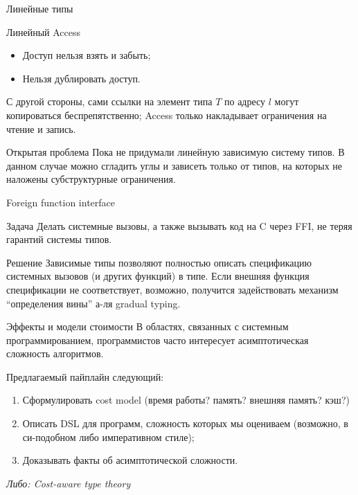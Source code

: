 \documentclass{beamer}
\begin{document}
\begin{frame}{Линейные типы}
  \begin{block}{Линейный Access}
    \begin{itemize}
      \item Доступ нельзя взять и забыть;
      \item Нельзя дублировать доступ.
    \end{itemize}
    С другой стороны, сами ссылки на элемент типа $T$ по адресу $l$ могут
    копироваться беспрепятственно; Access только накладывает ограничения на
    чтение и запись.
  \end{block}
  \begin{block}{Открытая проблема}
    Пока не придумали линейную зависимую систему типов. В данном
    случае можно сгладить углы и зависеть только от типов, на которых не
    наложены субструктурные ограничения.
  \end{block}
\end{frame}

\begin{frame}{Foreign function interface}
  \begin{block}{Задача}
    Делать системные вызовы, а также вызывать код на C через FFI, не теряя
    гарантий системы типов.
  \end{block}
  \begin{block}{Решение}
    Зависимые типы позволяют полностью описать спецификацию системных вызовов (и
    других функций) в типе. Если внешняя функция спецификации не соответствует,
    возможно, получится задействовать механизм ``определения вины'' а-ля gradual
    typing.
  \end{block}
\end{frame}

\begin{frame}{Эффекты и модели стоимости}
  В областях, связанных с системным программированием, программистов часто
  интересует асимптотическая сложность алгоритмов.

  Предлагаемый пайплайн следующий:
  \begin{enumerate}
    \item Сформулировать cost model (время работы? память? внешняя память? кэш?)
    \item Описать DSL для программ, сложность которых мы оцениваем (возможно, в
      си-подобном либо императивном стиле);
    \item Доказывать факты об асимптотической сложности.
  \end{enumerate}

  \textit{Либо: Cost-aware type theory}
\end{frame}
\end{document}
